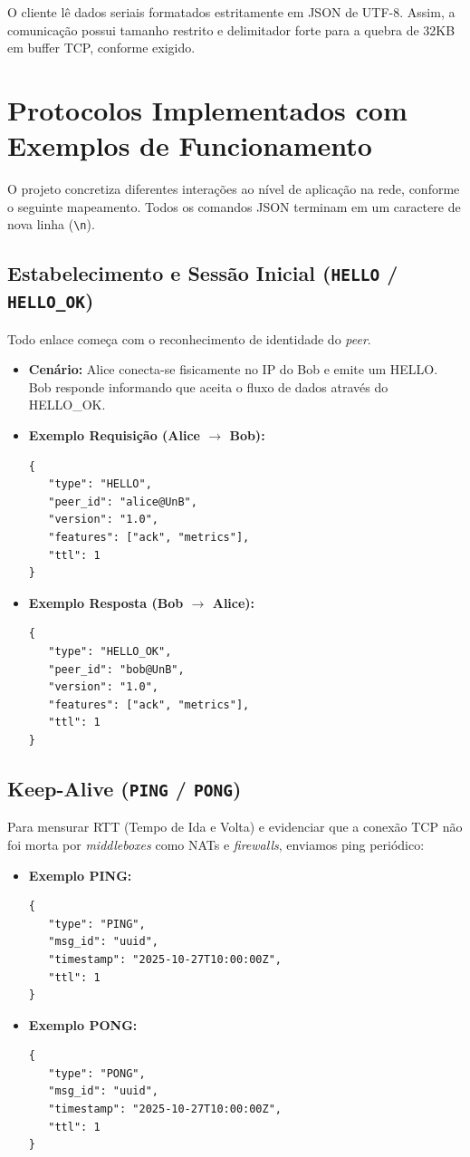 \documentclass[12pt,a4paper]{article}
\begin{document}
O cliente lê dados seriais formatados estritamente em JSON de UTF-8. Assim, a comunicação possui tamanho restrito e delimitador forte para a quebra de 32KB em buffer TCP, conforme exigido.

\section{Protocolos Implementados com Exemplos de Funcionamento}

O projeto concretiza diferentes interações ao nível de aplicação na rede, conforme o seguinte mapeamento. Todos os comandos JSON terminam em um caractere de nova linha (\texttt{\textbackslash n}).

\subsection{Estabelecimento e Sessão Inicial (\texttt{HELLO} / \texttt{HELLO\_OK})}
Todo enlace começa com o reconhecimento de identidade do \textit{peer}.
\begin{itemize}
    \item \textbf{Cenário:} Alice conecta-se fisicamente no IP do Bob e emite um HELLO. Bob responde informando que aceita o fluxo de dados através do HELLO\_OK.
    \item \textbf{Exemplo Requisição (Alice $\rightarrow$ Bob):}
\begin{lstlisting}[numbers=none]
{
   "type": "HELLO",
   "peer_id": "alice@UnB",
   "version": "1.0",
   "features": ["ack", "metrics"],
   "ttl": 1
}
\end{lstlisting}
    \item \textbf{Exemplo Resposta (Bob $\rightarrow$ Alice):}
\begin{lstlisting}[numbers=none]
{
   "type": "HELLO_OK",
   "peer_id": "bob@UnB",
   "version": "1.0",
   "features": ["ack", "metrics"],
   "ttl": 1
}
\end{lstlisting}
\end{itemize}

\subsection{Keep-Alive (\texttt{PING} / \texttt{PONG})}
Para mensurar RTT (Tempo de Ida e Volta) e evidenciar que a conexão TCP não foi morta por \textit{middleboxes} como NATs e \textit{firewalls}, enviamos ping periódico:
\begin{itemize}
    \item \textbf{Exemplo PING:}
\begin{lstlisting}[numbers=none]
{
   "type": "PING",
   "msg_id": "uuid",
   "timestamp": "2025-10-27T10:00:00Z",
   "ttl": 1
}
\end{lstlisting}
    \item \textbf{Exemplo PONG:}
\begin{lstlisting}[numbers=none]
{
   "type": "PONG",
   "msg_id": "uuid",
   "timestamp": "2025-10-27T10:00:00Z",
   "ttl": 1
}
\end{lstlisting}
\end{itemize}
\end{document}
